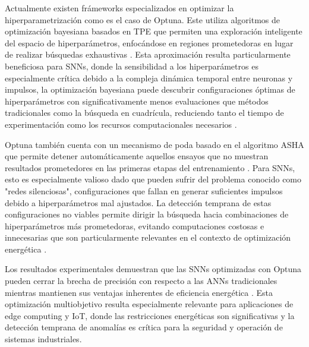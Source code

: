 Actualmente existen frámeworks especializados en optimizar la hiperparametrización como es el caso de Optuna. Este utiliza algoritmos de optimización bayesiana basados en TPE que permiten una exploración inteligente del espacio de hiperparámetros, enfocándose en regiones prometedoras en lugar de realizar búsquedas exhaustivas \cite{akiba_optuna_2019}. Esta aproximación resulta particularmente beneficiosa para SNNs, donde la sensibilidad a los hiperparámetros es especialmente crítica debido a la compleja dinámica temporal entre neuronas y impulsos, la optimización bayesiana puede descubrir configuraciones óptimas de hiperparámetros con significativamente menos evaluaciones que métodos tradicionales como la búsqueda en cuadrícula, reduciendo tanto el tiempo de experimentación como los recursos computacionales necesarios \cite{firmin_parallel_2024}.

Optuna también cuenta con un mecanismo de poda  basado en el algoritmo ASHA que permite detener automáticamente aquellos ensayos que no muestran resultados prometedores en las primeras etapas del entrenamiento \cite{broutonlab_efficient_2021}. Para SNNs, esto es especialmente valioso dado que pueden sufrir del problema conocido como "redes silenciosas", configuraciones que fallan en generar suficientes impulsos debido a hiperparámetros mal ajustados. La detección temprana de estas configuraciones no viables permite dirigir la búsqueda hacia combinaciones de hiperparámetros más prometedoras, evitando computaciones costosas e innecesarias que son particularmente relevantes en el contexto de optimización energética \cite{firmin_parallel_2024}. 

Los resultados experimentales demuestran que las SNNs optimizadas con Optuna pueden cerrar la brecha de precisión con respecto a las ANNs tradicionales mientras mantienen sus ventajas inherentes de eficiencia energética \cite{parsa_bayesian-based_2019}. Esta optimización multiobjetivo resulta especialmente relevante para aplicaciones de edge computing y IoT, donde las restricciones energéticas son significativas y la detección temprana de anomalías es crítica para la seguridad y operación de sistemas industriales.